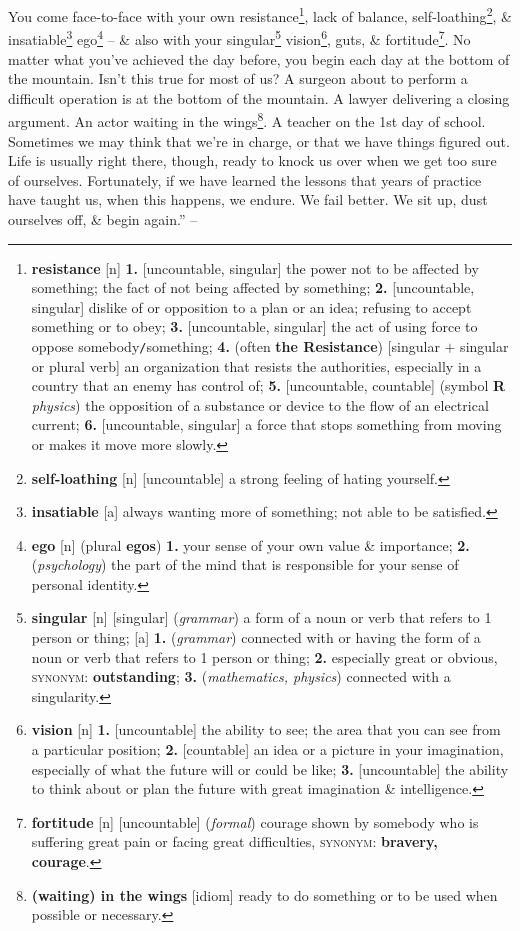 \documentclass[oneside]{book}
\numberwithin{equation}{section}
\begin{document}
 You come face-to-face with your own resistance\footnote{\textbf{resistance} [n] \textbf{1.} [uncountable, singular] the power not to be affected by something; the fact of not being affected by something; \textbf{2.} [uncountable, singular] dislike of or opposition to a plan or an idea; refusing to accept something or to obey; \textbf{3.} [uncountable, singular] the act of using force to oppose somebody\texttt{/}something; \textbf{4.} (often \textbf{the Resistance}) [singular $+$ singular or plural verb] an organization that resists the authorities, especially in a country that an enemy has control of; \textbf{5.} [uncountable, countable] (symbol \textbf{R} \textit{physics}) the opposition of a substance or device to the flow of an electrical current; \textbf{6.} [uncountable, singular] a force that stops something from moving or makes it move more slowly.}, lack of balance, self-loathing\footnote{\textbf{self-loathing} [n] [uncountable] a strong feeling of hating yourself.}, \& insatiable\footnote{\textbf{insatiable} [a] always wanting more of something; not able to be satisfied.} ego\footnote{\textbf{ego} [n] (plural \textbf{egos}) \textbf{1.} your sense of your own value \& importance; \textbf{2.} (\textit{psychology}) the part of the mind that is responsible for your sense of personal identity.} -- \& also with your singular\footnote{\textbf{singular} [n] [singular] (\textit{grammar}) a form of a noun or verb that refers to 1 person or thing; [a] \textbf{1.} (\textit{grammar}) connected with or having the form of a noun or verb that refers to 1 person or thing; \textbf{2.} especially great or obvious, \textsc{synonym}: \textbf{outstanding}; \textbf{3.} (\textit{mathematics, physics}) connected with a singularity.} vision\footnote{\textbf{vision} [n] \textbf{1.} [uncountable] the ability to see; the area that you can see from a particular position; \textbf{2.} [countable] an idea or a picture in your imagination, especially of what the future will or could be like; \textbf{3.} [uncountable] the ability to think about or plan the future with great imagination \& intelligence.}, guts, \& fortitude\footnote{\textbf{fortitude} [n] [uncountable] (\textit{formal}) courage shown by somebody who is suffering great pain or facing great difficulties, \textsc{synonym}: \textbf{bravery, courage}.}. No matter what you've achieved the day before, you begin each day at the bottom of the mountain. Isn't this true for most of us? A surgeon about to perform a difficult operation is at the bottom of the mountain. A lawyer delivering a closing argument. An actor waiting in the wings\footnote{\textbf{(waiting) in the wings} [idiom] ready to do something or to be used when possible or necessary.}. A teacher on the 1st day of school. Sometimes we may think that we're in charge, or that we have things figured out. Life is usually right there, though, ready to knock us over when we get too sure of ourselves. Fortunately, if we have learned the lessons that years of practice have taught us, when this happens, we endure. We fail better. We sit up, dust ourselves off, \& begin again.'' -- \cite[pp. 10--11]{Shapiro2014}
\end{document}
